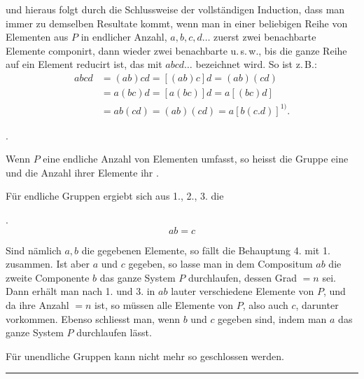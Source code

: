 

und hieraus folgt durch die Schlussweise der vollst\"andigen Induction, dass man immer zu demselben Resultate kommt, wenn man in einer beliebigen Reihe von Elementen aus $P$ in endlicher Anzahl, $a, b, c, d \ldots$ zuerst zwei benachbarte Elemente componirt, dann wieder zwei benachbarte u.\,s.\,w., bis die ganze Reihe auf ein Element reducirt ist, das mit $abcd \ldots$ bezeichnet wird. So ist z.\,B.:
\[
\begin{aligned}
abcd &= (ab)cd = [(ab)c]d = (ab)(cd)\\
&= a(bc)d = [a(bc)]d = a[(bc)d]\\
&= ab(cd) = (ab)(cd) = a[b(c.d)]^{1)}. %
\end{aligned}
\]

.\  %

Wenn $P$ eine endliche Anzahl von Elementen umfasst, so heisst die Gruppe eine  und die Anzahl ihrer Elemente ihr .

F\"ur endliche Gruppen ergiebt sich aus 1., 2., 3. die 

.\ 
\[
ab = c
\]

Sind n\"amlich $a, b$ die gegebenen Elemente, so f\"allt die Behauptung 4. mit 1. zusammen. Ist aber $a$ und $c$ gegeben, so lasse man in dem Compositum $ab$ die zweite Componente $b$ das ganze System $P$ durchlaufen, dessen Grad $= n$ sei. Dann erh\"alt man nach 1. und 3. in $ab$ lauter verschiedene Elemente von $P$, und da ihre Anzahl $= n$ ist, so m\"ussen alle Elemente von $P$, also auch $c$, darunter vorkommen. Ebenso schliesst man, wenn $b$ und $c$ gegeben sind, indem man $a$ das ganze System $P$ durchlaufen l\"asst.

F\"ur unendliche Gruppen kann nicht mehr so geschlossen werden. 

\noindent\rule{3cm}{0.4pt}

